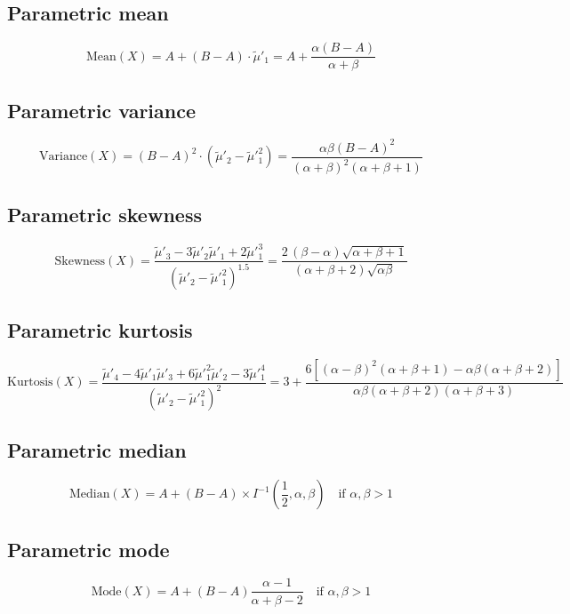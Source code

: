 \documentclass{article}
\begin{document}
\subsection{Parametric mean}
\begin{equation*} \mathrm{Mean}(X)=A+\left(B-A\right)\cdot\tilde{\mu}'_{1}=A+\frac{\alpha\left(B-A\right)}{\alpha+\beta} \end{equation*}
\subsection{Parametric variance}
\begin{equation*} \mathrm{Variance}(X)=\left(B-A\right)^{2}\cdot(\tilde{\mu}'_{2}-\tilde{\mu}'^{2}_{1})=\frac{\alpha\beta\left(B-A\right)^{2}}{(\alpha+\beta)^2(\alpha+\beta+1)} \end{equation*}
\subsection{Parametric skewness}
\begin{equation*} \mathrm{Skewness}(X)=\frac{\tilde{\mu}'_{3}-3\tilde{\mu}'_{2}\tilde{\mu}'_{1}+2\tilde{\mu}'^{3}_{1}}{(\tilde{\mu}'_{2}-\tilde{\mu}'^{2}_{1})^{1.5}}=\frac{2\,(\beta-\alpha)\sqrt{\alpha+\beta+1}}{(\alpha+\beta+2)\sqrt{\alpha\beta}} \end{equation*}
\subsection{Parametric kurtosis}
\begin{equation*} \mathrm{Kurtosis}(X)=\frac{\tilde{\mu}'_{4}-4\tilde{\mu}'_{1}\tilde{\mu}'_{3}+6\tilde{\mu}'^{2}_{1}\tilde{\mu}'_{2}-3\tilde{\mu}'^{4}_{1}}{(\tilde{\mu}'_{2}-\tilde{\mu}'^{2}_{1})^{2}}=3+\frac{6[(\alpha-\beta)^2 (\alpha +\beta+1)-\alpha \beta (\alpha+\beta+2)]}{\alpha \beta (\alpha+\beta+2) (\alpha+\beta+3)} \end{equation*}
\subsection{Parametric median}
\begin{equation*} \mathrm{Median}(X)=A+(B-A)\times I^{-1}\left(\frac{1}{2},\alpha,\beta\right) \quad \text{if }\alpha,\beta>1 \end{equation*}
\subsection{Parametric mode}
\begin{equation*} \mathrm{Mode}(X)=A+(B-A)\frac{\alpha-1}{\alpha+\beta-2} \quad \text{if }\alpha,\beta>1 \end{equation*}
\end{document}
